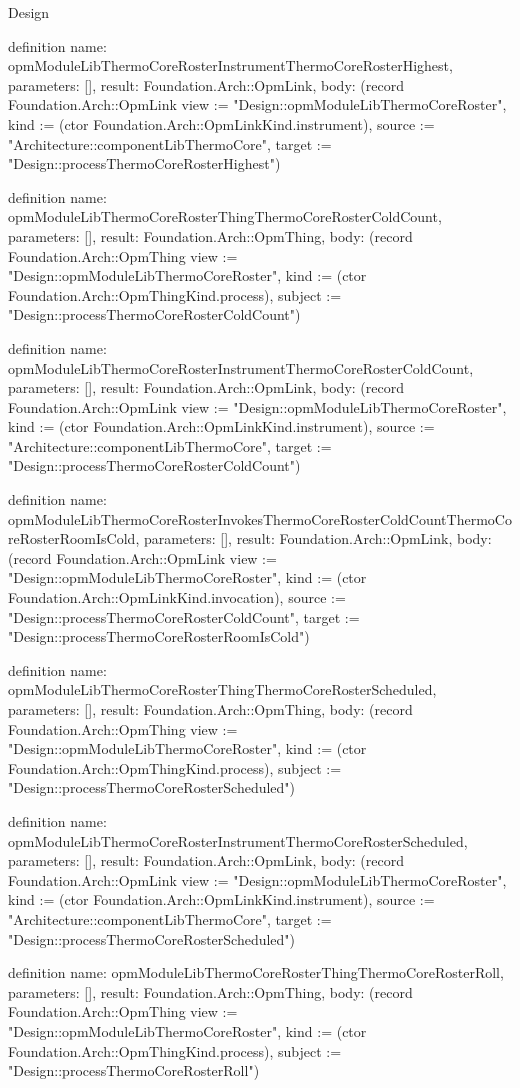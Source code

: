 \begin{lexlean}{Design}
\begin{semanticmodule}
definition{
  name: opmModuleLibThermoCoreRosterInstrumentThermoCoreRosterHighest,
  parameters: [],
  result: Foundation.Arch::OpmLink,
  body: (record Foundation.Arch::OpmLink {view := "Design::opmModuleLibThermoCoreRoster", kind := (ctor Foundation.Arch::OpmLinkKind.instrument), source := "Architecture::componentLibThermoCore", target := "Design::processThermoCoreRosterHighest"})
}

definition{
  name: opmModuleLibThermoCoreRosterThingThermoCoreRosterColdCount,
  parameters: [],
  result: Foundation.Arch::OpmThing,
  body: (record Foundation.Arch::OpmThing {view := "Design::opmModuleLibThermoCoreRoster", kind := (ctor Foundation.Arch::OpmThingKind.process), subject := "Design::processThermoCoreRosterColdCount"})
}

definition{
  name: opmModuleLibThermoCoreRosterInstrumentThermoCoreRosterColdCount,
  parameters: [],
  result: Foundation.Arch::OpmLink,
  body: (record Foundation.Arch::OpmLink {view := "Design::opmModuleLibThermoCoreRoster", kind := (ctor Foundation.Arch::OpmLinkKind.instrument), source := "Architecture::componentLibThermoCore", target := "Design::processThermoCoreRosterColdCount"})
}

definition{
  name: opmModuleLibThermoCoreRosterInvokesThermoCoreRosterColdCountThermoCoreRosterRoomIsCold,
  parameters: [],
  result: Foundation.Arch::OpmLink,
  body: (record Foundation.Arch::OpmLink {view := "Design::opmModuleLibThermoCoreRoster", kind := (ctor Foundation.Arch::OpmLinkKind.invocation), source := "Design::processThermoCoreRosterColdCount", target := "Design::processThermoCoreRosterRoomIsCold"})
}

definition{
  name: opmModuleLibThermoCoreRosterThingThermoCoreRosterScheduled,
  parameters: [],
  result: Foundation.Arch::OpmThing,
  body: (record Foundation.Arch::OpmThing {view := "Design::opmModuleLibThermoCoreRoster", kind := (ctor Foundation.Arch::OpmThingKind.process), subject := "Design::processThermoCoreRosterScheduled"})
}

definition{
  name: opmModuleLibThermoCoreRosterInstrumentThermoCoreRosterScheduled,
  parameters: [],
  result: Foundation.Arch::OpmLink,
  body: (record Foundation.Arch::OpmLink {view := "Design::opmModuleLibThermoCoreRoster", kind := (ctor Foundation.Arch::OpmLinkKind.instrument), source := "Architecture::componentLibThermoCore", target := "Design::processThermoCoreRosterScheduled"})
}

definition{
  name: opmModuleLibThermoCoreRosterThingThermoCoreRosterRoll,
  parameters: [],
  result: Foundation.Arch::OpmThing,
  body: (record Foundation.Arch::OpmThing {view := "Design::opmModuleLibThermoCoreRoster", kind := (ctor Foundation.Arch::OpmThingKind.process), subject := "Design::processThermoCoreRosterRoll"})
}


\end{semanticmodule}
\end{lexlean}
